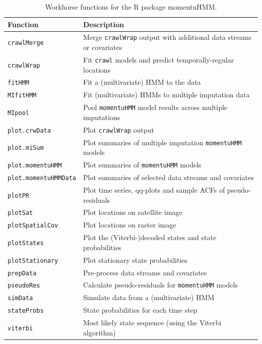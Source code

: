 \documentclass[12pt]{article}\usepackage[]{graphicx}\usepackage[]{color}
\begin{document}
\begin{table}
  \caption{\label{tab:functions} Workhorse functions for the R package momentuHMM.}
  \begin{tabular}{ll}
  \toprule
  Function & Description \tabularnewline
  \midrule
  \verb|crawlMerge| & Merge \verb|crawlWrap| output with additional data streams or covariates  \tabularnewline 
  \verb|crawlWrap| & Fit \verb|crawl| models and predict temporally-regular locations  \tabularnewline  
  \verb|fitHMM| & Fit a (multivariate) HMM to the data  \tabularnewline  
  \verb|MIfitHMM| & Fit (multivariate) HMMs to multiple imputation data  \tabularnewline  
  \verb|MIpool| & Pool \verb|momentuHMM| model results across multiple imputations  \tabularnewline 
  \verb|plot.crwData| & Plot \verb|crawlWrap| output \tabularnewline 
  \verb|plot.miSum| & Plot summaries of multiple imputation \verb|momentuHMM| models  \tabularnewline 
  \verb|plot.momentuHMM| & Plot summaries of \verb|momentuHMM| models  \tabularnewline 
  \verb|plot.momentuHMMData| & Plot summaries of selected data streams and covariates  \tabularnewline 
  \verb|plotPR| & Plot time series, qq-plots and sample ACFs of pseudo-residuals \tabularnewline 
  \verb|plotSat| & Plot locations on satellite image \tabularnewline   
  \verb|plotSpatialCov| & Plot locations on raster image \tabularnewline   
  \verb|plotStates| & Plot the (Viterbi-)decoded states and state probabilities \tabularnewline 
  \verb|plotStationary| & Plot stationary state probabilities \tabularnewline
  \verb|prepData| & Pre-process data streams and covariates \tabularnewline 
  \verb|pseudoRes| & Calculate pseudo-residuals for \verb|momentuHMM| models \tabularnewline 
  \verb|simData| & Simulate data from a (multivariate) HMM \tabularnewline 
  \verb|stateProbs| & State probabilities for each time step \tabularnewline 
  \verb|viterbi| & Most likely state sequence (using the Viterbi algorithm)  \tabularnewline  
  \bottomrule
  \end{tabular}
\end{table}
\end{document}
